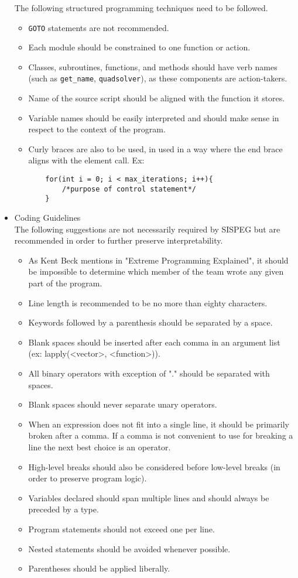 \documentclass[12pt]{article}
\begin{document}
\begin{itemize}
	The following structured programming techniques need to be followed. 
	\begin{itemize}
	\item \verb|GOTO| statements are not recommended. 
	\item Each module should be constrained to one function or action. 
	\item Classes, subroutines, functions, and methods should have verb names (such as \verb|get_name|, \verb|quadsolver|), as these components are action-takers. 
	\item Name of the source script should be aligned with the function it stores. 
	\item Variable names should be easily interpreted and should make sense in respect to the context of the program. 
	\item Curly braces are also to be used, in used in a way where the end brace aligns with the element call. Ex:
	\begin{verbatim}
	for(int i = 0; i < max_iterations; i++){
		/*purpose of control statement*/
	}
	\end{verbatim}
	\end{itemize}
\item Coding Guidelines\\
	The following suggestions are not necessarily required by SISPEG but are recommended in order to further preserve interpretability.
	\begin{itemize}
	 \item As Kent Beck mentions in "Extreme Programming Explained", it should be impossible to determine which member of the team wrote any given part of the program. 
	 \item Line length is recommended to be no more than eighty characters. 
	 \item Keywords followed by a parenthesis should be separated by a space. 
	 \item Blank spaces should be inserted after each comma in an argument list (ex: lapply(<vector>,  <function>)).
	 \item All binary operators with exception of "." should be separated with spaces. 
	 \item Blank spaces should never separate unary operators. 
	 \item When an expression does not fit into a single line, it should be primarily broken after a comma. If a comma is not convenient to use for breaking a line the next best choice is an operator.
	 \item High-level breaks should also be considered before low-level breaks (in order to preserve program logic). 
	 \item Variables declared should span multiple lines and should always be preceded by a type. 
	 \item Program statements should not exceed one per line. 
	 \item Nested statements should be avoided whenever possible. 
	 \item Parentheses should be applied liberally.
	\end{itemize}
\end{itemize}
\end{document}
